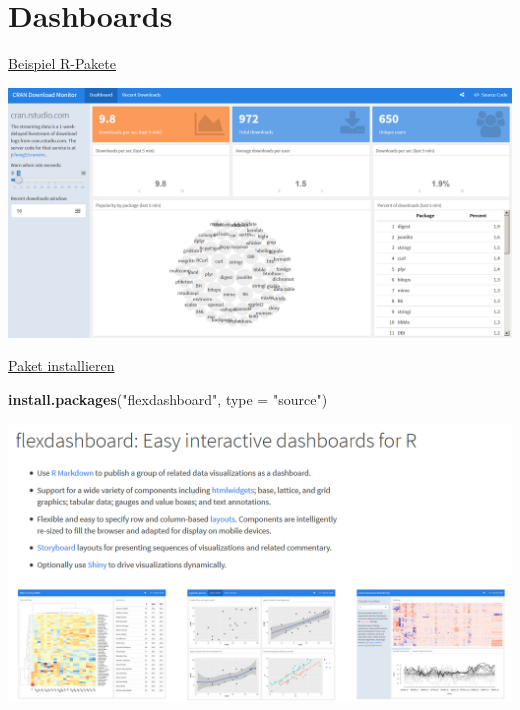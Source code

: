 \documentclass[ignorenonframetext,]{beamer}
\newenvironment{Shaded}{}{}
\newcommand{\KeywordTok}[1]{\textcolor[rgb]{0.00,0.44,0.13}{\textbf{{#1}}}}
\newcommand{\DataTypeTok}[1]{\textcolor[rgb]{0.56,0.13,0.00}{{#1}}}
\newcommand{\StringTok}[1]{\textcolor[rgb]{0.25,0.44,0.63}{{#1}}}
\newcommand{\NormalTok}[1]{{#1}}
\begin{document}
\section{Dashboards}\label{dashboards}

\begin{frame}{\href{https://gallery.shinyapps.io/cran-gauge/}{Beispiel
R-Pakete}}

\includegraphics{./tex2pdf.956/a853199d8c52109309acb7b49e363481b04e7192.png}

\end{frame}

\begin{frame}[fragile]{\href{https://blog.rstudio.org/2016/05/17/flexdashboard-easy-interactive-dashboards-for-r/}{Paket
installieren}}

\begin{Shaded}
\begin{Highlighting}[]
\KeywordTok{install.packages}\NormalTok{(}\StringTok{"flexdashboard"}\NormalTok{, }\DataTypeTok{type =} \StringTok{"source"}\NormalTok{)}
\end{Highlighting}
\end{Shaded}

\includegraphics{./tex2pdf.956/8a6432ad24b0155cd18f45caca068ee6de695690.png}

\end{frame}
\end{document}
